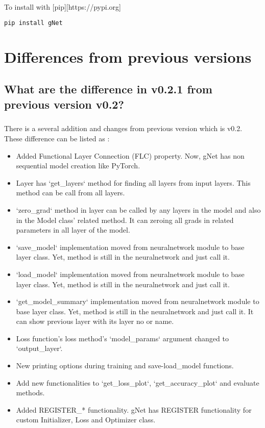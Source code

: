 \documentclass[12pt]{report}
\begin{document}
To install with [pip][https://pypi.org]
\begin{lstlisting}[language=bash, numbers=none, caption={Install with pip}, label={ex:install}]
pip install gNet
\end{lstlisting}


\chapter{Differences from previous versions}

\section{What are the difference in v0.2.1 from previous version v0.2?}

\paragraph{}
There is a several addition and changes from previous version which is v0.2. These difference can be listed as :

\begin{itemize}
	\item Added Functional Layer Connection (FLC) property. Now, gNet has non sequential model creation like PyTorch.
	\item Layer has `get\_layers` method for finding all layers from input layers. This method can be call from all layers.
	\item `zero\_grad` method in layer can be called by any layers in the model and also in the Model class' related method. It can zeroing all grads in related parameters in all layer of the model.
	\item `save\_model` implementation moved from neuralnetwork module to base layer class. Yet, method is still in the neuralnetwork and just call it.
	\item `load\_model` implementation moved from neuralnetwork module to base layer class. Yet, method is still in the neuralnetwork and just call it.
	\item `get\_model\_summary` implementation moved from neuralnetwork module to base layer class. Yet, method is still in the neuralnetwork and just call it. It can show previous layer with its layer no or name.
	\item Loss function's loss method's `model\_params` argument changed to `output\_layer`.
	\item New printing options during training and save-load\_model functions.
	\item Add new functionalities to `get\_loss\_plot`, `get\_accuracy\_plot` and evaluate methods.
	\item Added REGISTER\_* functionality. gNet has REGISTER functionality for custom Initializer, Loss and Optimizer class.
	
\end{itemize}
\end{document}
